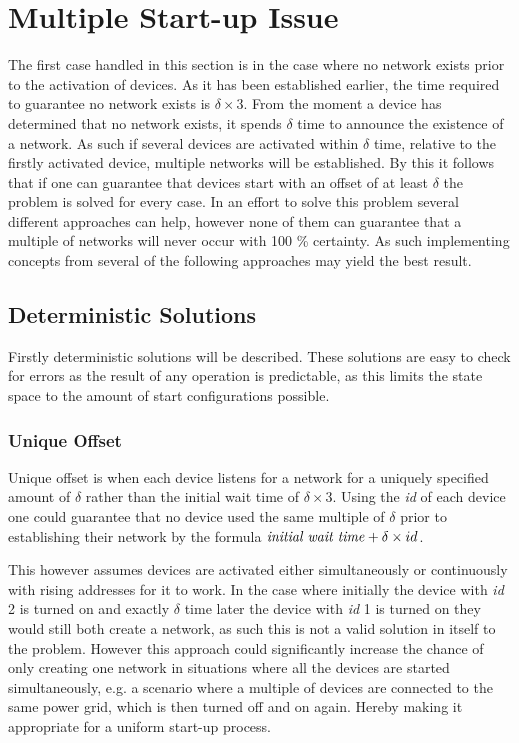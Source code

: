 \section{Multiple Start-up Issue}\label{sec:MSI-CCRC}
The first case handled in this section is in the case where no network exists prior to the activation of devices.
As it has been established earlier, the time required to guarantee no network exists is $\delta \times 3$.
From the moment a device has determined that no network exists, it spends $\delta$ time to announce the existence of a network.
As such if several devices are activated within $\delta$ time, relative to the firstly activated device, multiple networks will be established.
By this it follows that if one can guarantee that devices start with an offset of at least $\delta$ the problem is solved for every case.
In an effort to solve this problem several different approaches can help, however none of them can guarantee that a multiple of networks will never occur with 100 \% certainty. 
As such implementing concepts from several of the following approaches may yield the best result.

\subsection{Deterministic Solutions}
Firstly deterministic solutions will be described.
These solutions are easy to check for errors as the result of any operation is predictable, as this limits the state space to the amount of start configurations possible.

\subsubsection{Unique Offset}
Unique offset is when each device listens for a network for a uniquely specified amount of $\delta$ rather than the initial wait time of $\delta \times 3$.
Using the \textit{id} of each device one could guarantee that no device used the same multiple of $\delta$ prior to establishing their network by the formula $\text{\textit{initial wait time}} + \delta \times id$.

This however assumes devices are activated either simultaneously or continuously with rising addresses for it to work.
In the case where initially the device with \textit{id} 2 is turned on and exactly $\delta$ time later the device with \textit{id} 1 is turned on they would still both create a network, as such this is not a valid solution in itself to the problem.
However this approach could significantly increase the chance of only creating one network in situations where all the devices are started simultaneously, e.g. a scenario where a multiple of devices are connected to the same power grid, which is then turned off and on again.
Hereby making it appropriate for a uniform start-up process.

